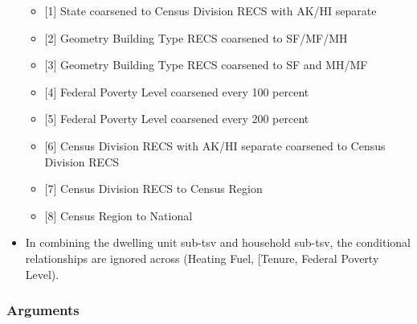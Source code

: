 \begin{itemize}
  \begin{itemize}
   
  \item
    {[}1{]} State coarsened to Census Division RECS with AK/HI separate
  \item
    {[}2{]} Geometry Building Type RECS coarsened to SF/MF/MH
  \item
    {[}3{]} Geometry Building Type RECS coarsened to SF and MH/MF
  \item
    {[}4{]} Federal Poverty Level coarsened every 100 percent
  \item
    {[}5{]} Federal Poverty Level coarsened every 200 percent
  \item
    {[}6{]} Census Division RECS with AK/HI separate coarsened to Census
    Division RECS
  \item
    {[}7{]} Census Division RECS to Census Region
  \item
    {[}8{]} Census Region to National
  \end{itemize}
\item
  In combining the dwelling unit sub-tsv and household sub-tsv, the
  conditional relationships are ignored across (\textquotesingle Heating
  Fuel\textquotesingle, {[}\textquotesingle Tenure\textquotesingle,
  \textquotesingle Federal Poverty Level\textquotesingle{]}).
\end{itemize}

\subsubsection{Arguments}\label{arguments-74}

